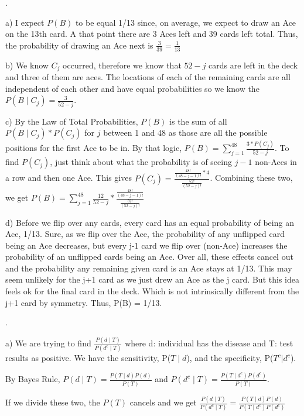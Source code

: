 \documentclass[11pt]{article}
\begin{document}
\bigskip
\pagebreak
{}.
\smallskip	

	a) I expect $P(B)$ to be equal 1/13 since, on average, we expect to draw an Ace on the 13th card.  A that point there are 3 Aces left and 39 cards left total.  Thus, the probability of drawing an Ace next is $\frac{3}{39} = \boxed{\frac{1}{13}}$
\smallskip	

	b) We know $C_j$ occurred, therefore we know that $52-j$ cards are left in the deck and three of them are aces.  The locations of each of the remaining cards are all independent of each other and have equal probabilities so we know the $\boxed{P(B \mid C_j) = \frac{3}{52-j}}$.
\smallskip	

	c) By the Law of Total Probabilities, $P(B)$ is the sum of all $P(B \mid C_j)*P(C_j)$ for $j$ between 1 and 48 as those are all the possible positions for the first Ace to be in.  By that logic, $P(B) = \sum_{j = 1}^{48}\frac{3*P(C_j)}{52-j}$.  To find $P(C_j)$, just think about what the probability is of seeing $j-1$ non-Aces in a row and then one Ace.  This gives $P(C_j) = \frac{\frac{48!}{(48-j-1)!}*4}{\frac{52!}{(52-j)!}}$.
	Combining these two, we get $P(B) = \sum_{j = 1}^{48}\frac{12}{52-j}*\frac{\frac{48!}{(48-j-1)!}}{\frac{52!}{(52-j)!}} $
\smallskip	

	d) Before we flip over any cards, every card has an equal probability of being an Ace, 1/13.  Sure, as we flip over the Ace, the probability of any unflipped card being an Ace decreases, but every j-1 card we flip over (non-Ace) increases the probability of an unflipped cards being an Ace.  Over all, these effects cancel out and the probability any remaining given card is an Ace stays at 1/13.  This may seem unlikely for the j+1 card as we just drew an Ace as the j card. But this idea feels ok for the final card in the deck.  Which is not intrinsically different from the j+1 card by symmetry.  Thus, P(B) = 1/13. 

\bigskip

.
\smallskip	

	a) We are trying to find $\frac{P(d\mid T)}{P(d^c\mid T)}$ where d: individual has the disease and T: test results as positive.  We have the sensitivity, P($T\mid d$), and the specificity, P($T^{c}|d^{c}$). 
	
	By Bayes Rule, $P(d\mid T) = \frac{P(T\mid d)P(d)}{P(T)}$ and $P(d^c\mid T) = \frac{P(T\mid d^c)P(d^c)}{P(T)}$.  
	
	If we divide these two, the $P(T)$ cancels and we get $\frac{P(d\mid T)}{P(d^c\mid T)} = \frac{P(T\mid d)P(d)}{P(T\mid d^c)P(d^c)}$
\end{document}
